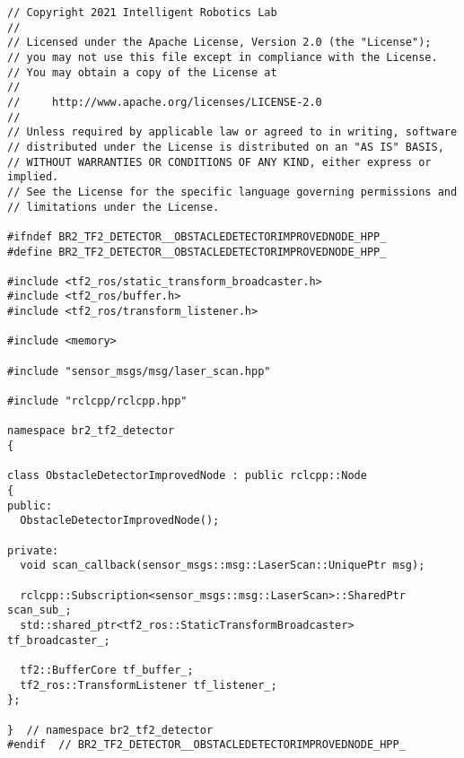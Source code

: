  \footnotesize
\begin{tcolorbox}[sharp corners, colframe=gray!80, colback=LightGray, left=0pt, top=0pt, bottom=0pt, title=\texttt{br2\_tf2\_detector/include/br2\_tf2\_detector/ObstacleDetectorImprovedNode.hpp}]
  \begin{verbatim}
// Copyright 2021 Intelligent Robotics Lab
//
// Licensed under the Apache License, Version 2.0 (the "License");
// you may not use this file except in compliance with the License.
// You may obtain a copy of the License at
//
//     http://www.apache.org/licenses/LICENSE-2.0
//
// Unless required by applicable law or agreed to in writing, software
// distributed under the License is distributed on an "AS IS" BASIS,
// WITHOUT WARRANTIES OR CONDITIONS OF ANY KIND, either express or implied.
// See the License for the specific language governing permissions and
// limitations under the License.

#ifndef BR2_TF2_DETECTOR__OBSTACLEDETECTORIMPROVEDNODE_HPP_
#define BR2_TF2_DETECTOR__OBSTACLEDETECTORIMPROVEDNODE_HPP_

#include <tf2_ros/static_transform_broadcaster.h>
#include <tf2_ros/buffer.h>
#include <tf2_ros/transform_listener.h>

#include <memory>

#include "sensor_msgs/msg/laser_scan.hpp"

#include "rclcpp/rclcpp.hpp"

namespace br2_tf2_detector
{

class ObstacleDetectorImprovedNode : public rclcpp::Node
{
public:
  ObstacleDetectorImprovedNode();

private:
  void scan_callback(sensor_msgs::msg::LaserScan::UniquePtr msg);

  rclcpp::Subscription<sensor_msgs::msg::LaserScan>::SharedPtr scan_sub_;
  std::shared_ptr<tf2_ros::StaticTransformBroadcaster> tf_broadcaster_;

  tf2::BufferCore tf_buffer_;
  tf2_ros::TransformListener tf_listener_;
};

}  // namespace br2_tf2_detector
#endif  // BR2_TF2_DETECTOR__OBSTACLEDETECTORIMPROVEDNODE_HPP_
    \end{verbatim}
    \end{tcolorbox}
  \normalsize

